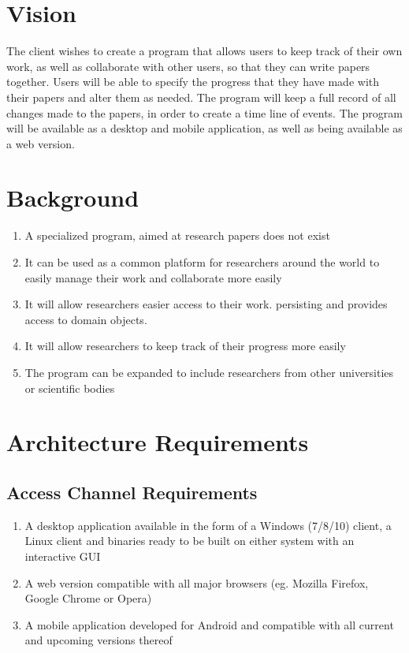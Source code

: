 \documentclass[hidelinks,a4paper,12pt]{article}
\begin{document}
\section{Vision}
The client wishes to create a program that allows users to keep track of their own work, as well as collaborate with other users, so that they can write papers together. Users will be able to specify the progress that they have made with their papers and alter them as needed. The program will keep a full record of all changes made to the papers, in order to create a time line of events. The program will be available as a desktop and mobile application, as well as being available as a web version.

\section{Background}
\begin{enumerate}
	\item A specialized program, aimed at research papers does not exist
	\item It can be used as a common platform for researchers around the world to easily manage their work and collaborate more easily
	\item It will allow researchers easier access to their work. persisting and provides access to domain objects.
	\item It will allow researchers to keep track of their progress more easily
	\item The program can be expanded to include researchers from other universities or scientific bodies
\end{enumerate}
\newpage

\section{Architecture Requirements}
	\subsection{Access Channel Requirements}
	\begin{enumerate}
		\item A desktop application available in the form of a Windows (7/8/10) client, a Linux client and binaries
		ready to be built on either system with an interactive GUI
		\item A web version compatible with all major browsers (eg. Mozilla Firefox, Google Chrome or Opera)
		\item A mobile application developed for Android and compatible with all current and upcoming versions thereof
	\end{enumerate}
	
\end{document}
